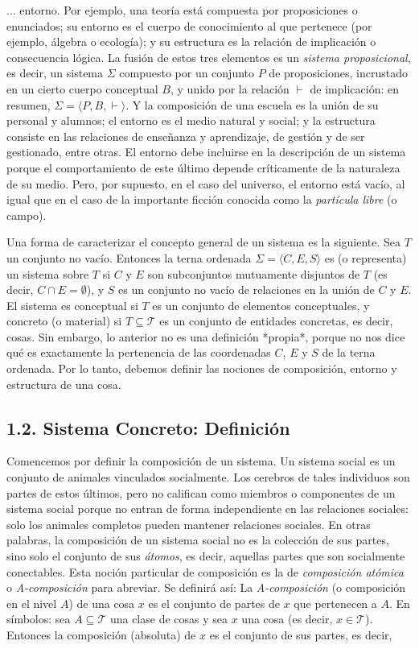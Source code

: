 {\fontsize{13}{15}\selectfont
... entorno. Por ejemplo, una teoría está compuesta por proposiciones o enunciados; su entorno es el cuerpo de conocimiento al que pertenece (por ejemplo, álgebra o ecología); y su estructura es la relación de implicación o consecuencia lógica. La fusión de estos tres elementos es un \textit{sistema proposicional}, es decir, un sistema $\Sigma$ compuesto por un conjunto $P$ de proposiciones, incrustado en un cierto cuerpo conceptual $B$, y unido por la relación $\vdash$ de implicación: en resumen, $\Sigma = \langle P, B, \vdash \rangle$. Y la composición de una escuela es la unión de su personal y alumnos; el entorno es el medio natural y social; y la estructura consiste en las relaciones de enseñanza y aprendizaje, de gestión y de ser gestionado, entre otras. El entorno debe incluirse en la descripción de un sistema porque el comportamiento de este último depende críticamente de la naturaleza de su medio. Pero, por supuesto, en el caso del universo, el entorno está vacío, al igual que en el caso de la importante ficción conocida como la \textit{partícula libre} (o campo).

Una forma de caracterizar el concepto general de un sistema es la siguiente. Sea $T$ un conjunto no vacío. Entonces la terna ordenada $\Sigma = \langle C, E, S \rangle$ es (o representa) un sistema sobre $T$ si $C$ y $E$ son subconjuntos mutuamente disjuntos de $T$ (es decir, $C \cap E = \emptyset$), y $S$ es un conjunto no vacío de relaciones en la unión de $C$ y $E$. El sistema es conceptual si $T$ es un conjunto de elementos conceptuales, y concreto (o material) si $T \subseteq \mathcal{T}$ es un conjunto de entidades concretas, es decir, cosas. Sin embargo, lo anterior no es una definición *propia*, porque no nos dice qué es exactamente la pertenencia de las coordenadas $C$, $E$ y $S$ de la terna ordenada. Por lo tanto, debemos definir las nociones de composición, entorno y estructura de una cosa.

\subsection*{1.2. Sistema Concreto: Definición}
Comencemos por definir la composición de un sistema. Un sistema social es un conjunto de animales vinculados socialmente. Los cerebros de tales individuos son partes de estos últimos, pero no califican como miembros o componentes de un sistema social porque no entran de forma independiente en las relaciones sociales: solo los animales completos pueden mantener relaciones sociales. En otras palabras, la composición de un sistema social no es la colección de sus partes, sino solo el conjunto de sus \textit{átomos}, es decir, aquellas partes que son socialmente conectables. Esta noción particular de composición es la de \textit{composición atómica} o \textit{A-composición} para abreviar. Se definirá así: La \textit{A-composición} (o composición en el nivel $A$) de una cosa $x$ es el conjunto de partes de $x$ que pertenecen a $A$. En símbolos: sea $A \subseteq \mathcal{T}$ una clase de cosas y sea $x$ una cosa (es decir, $x \in \mathcal{T}$). Entonces la composición (absoluta) de $x$ es el conjunto de sus partes, es decir,
}

